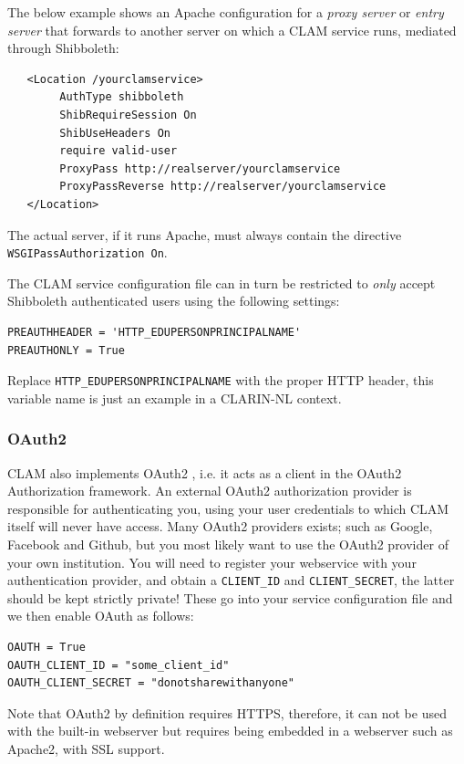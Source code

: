 \documentclass[a4paper,12pt]{report}
\begin{document}
The below example shows an Apache configuration for a \emph{proxy server} or
\emph{entry server} that forwards to another server on which a CLAM service runs, mediated
through Shibboleth:

\begin{verbatim}
   <Location /yourclamservice>
        AuthType shibboleth
        ShibRequireSession On
        ShibUseHeaders On
        require valid-user
        ProxyPass http://realserver/yourclamservice
        ProxyPassReverse http://realserver/yourclamservice
   </Location>
\end{verbatim}

The actual server, if it runs Apache, must always contain the directive
\texttt{WSGIPassAuthorization On}.

The CLAM service configuration file can in turn be restricted to \emph{only}
accept Shibboleth authenticated users using the following settings:

\begin{verbatim}
PREAUTHHEADER = 'HTTP_EDUPERSONPRINCIPALNAME'
PREAUTHONLY = True
\end{verbatim}

Replace \texttt{HTTP\_EDUPERSONPRINCIPALNAME} with the proper HTTP header, this
variable name is just an example in a CLARIN-NL context.

\subsubsection{OAuth2}

CLAM also implements OAuth2 \cite{OAUTH2}, i.e. it acts as a client in the
OAuth2 Authorization framework. An external OAuth2 authorization provider is
responsible for authenticating you, using your user credentials to which CLAM
itself will never have access. Many OAuth2 providers exists; such as Google,
Facebook and Github, but you most likely want to use the OAuth2 provider of
your own institution. You will need to register your webservice with your
authentication provider, and obtain a \texttt{CLIENT\_ID} and
\texttt{CLIENT\_SECRET}, the latter should be kept strictly private! These go
into your service configuration file and we then enable OAuth as follows: 

\begin{verbatim}
OAUTH = True
OAUTH_CLIENT_ID = "some_client_id"
OAUTH_CLIENT_SECRET = "donotsharewithanyone"
\end{verbatim}

Note that OAuth2 by definition requires HTTPS, therefore, it can not be used
with the built-in webserver but requires being embedded in a webserver such as
Apache2, with SSL support.
\end{document}
